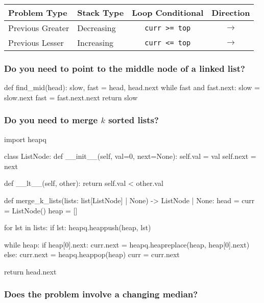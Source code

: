 \documentclass[12pt, titlepage]{article}
\begin{document}
\begin{center}
\begin{tabular}{|l|l|c|c|}
  \hline
  Problem Type & Stack Type & Loop Conditional & Direction \\
  \hline
  Previous Greater & Decreasing & \texttt{curr >= top} & $\rightarrow$ \\
  Previous Lesser & Increasing & \texttt{curr <= top} & $\rightarrow$ \\
  \hline
\end{tabular}
\end{center} \bigskip

\subsubsection{Do you need to point to the middle node of a linked list?}

\begin{python}
def find_mid(head):
    slow, fast = head, head.next
    while fast and fast.next:
        slow = slow.next
        fast = fast.next.next
    return slow
\end{python}

\subsubsection{Do you need to merge $k$ sorted lists?}

\begin{python}
import heapq

class ListNode:
    def __init__(self, val=0, next=None):
        self.val = val
        self.next = next

    def __lt__(self, other):
        return self.val < other.val

def merge_k_lists(lists: list[ListNode] | None) -> ListNode | None:
    head = curr = ListNode()
    heap = []

    for lst in lists:
        if lst:
            heapq.heappush(heap, lst)

    while heap:
        if heap[0].next:
            curr.next = heapq.heapreplace(heap, heap[0].next)
        else:
            curr.next = heapq.heappop(heap)
        curr = curr.next

    return head.next
\end{python}

\subsubsection{Does the problem involve a changing median?}
\end{document}
